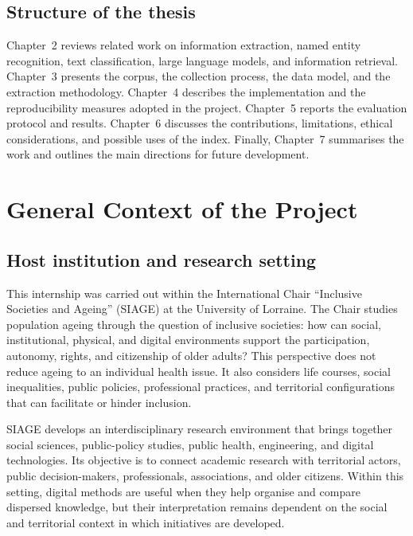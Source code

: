 \documentclass[
11pt,
english,
singlespacing,
headsepline,
]{MastersDoctoralThesis}
\begin{document}
\section{Structure of the thesis}

Chapter~2 reviews related work on information extraction, named entity
recognition, text classification, large language models, and information
retrieval. Chapter~3 presents the corpus, the collection process, the data model,
and the extraction methodology. Chapter~4 describes the implementation and the
reproducibility measures adopted in the project. Chapter~5 reports the evaluation
protocol and results. Chapter~6 discusses the contributions, limitations, ethical
considerations, and possible uses of the index. Finally, Chapter~7 summarises the
work and outlines the main directions for future development.


\chapter{General Context of the Project}

\section{Host institution and research setting}

This internship was carried out within the International Chair ``Inclusive
Societies and Ageing'' (SIAGE) at the University of Lorraine. The Chair studies
population ageing through the question of inclusive societies: how can social,
institutional, physical, and digital environments support the participation,
autonomy, rights, and citizenship of older adults? This perspective does not
reduce ageing to an individual health issue. It also considers life courses,
social inequalities, public policies, professional practices, and territorial
configurations that can facilitate or hinder inclusion.

SIAGE develops an interdisciplinary research environment that brings together
social sciences, public-policy studies, public health, engineering, and digital
technologies. Its objective is to connect academic research with territorial
actors, public decision-makers, professionals, associations, and older citizens.
Within this setting, digital methods are useful when they help organise and
compare dispersed knowledge, but their interpretation remains dependent on the
social and territorial context in which initiatives are developed.
\end{document}
